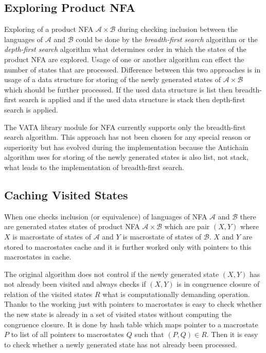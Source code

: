 \subsection{Exploring Product NFA}
Exploring of a product NFA $\mathcal{A}\times\mathcal{B}$ during checking inclusion between the languages of $\mathcal{A}$ and $\mathcal{B}$ could be done by 
the \emph{breadth-first search} \cite{taocp} algorithm or the \emph{depth-first search} \cite{taocp} algorithm what
determines order in which the states of the product NFA are explored. Usage of one or another algorithm can effect the number of states that are processed. 
Difference between this two approaches is in usage of a data structure for storing of the newly generated states of $\mathcal{A}\times\mathcal{B}$
which should be further processed. If the used data structure is list then breadth-first search is applied and if the used data structure is stack then 
depth-first search is applied.

The VATA library module for NFA currently supports only the breadth-first search algorithm. This approach has not been chosen for any special reason or superiority
but has evolved during the implementation because the Antichain algorithm uses for storing of 
the newly generated states is also list, not stack, what leads to the implementation of breadth-first search.


\subsection{Caching Visited States}
When one checks inclusion (or equivalence) of languages of NFA $\mathcal{A}$ and $\mathcal{B}$ there are generated states states of product NFA $\mathcal{A}
\times \mathcal{B}$ which are pair $(X,Y)$ where $X$ is macrostate of states of $\mathcal{A}$ and $Y$ is macrostate of states of $\mathcal{B}$. $X$ and $Y$
are stored to macrostates cache and it is further worked only with pointers to this macrostates in cache.

The original algorithm does not control if the newly generated state $(X,Y)$ has not already been visited and always checks if $(X,Y)$ is in
congruence closure of relation of the visited states $R$  what is
computationally demanding operation. Thanks to the working just with pointers to macrostates is easy to check whether the new state is already in a set of 
visited states without computing the congruence closure. It is done by hash table which maps pointer to a macrostate $P$ to list of all
pointers to macrostates $Q$ such that $(P,Q)\in R$. Then it is easy to check whether a newly generated state has not already been processed. 

